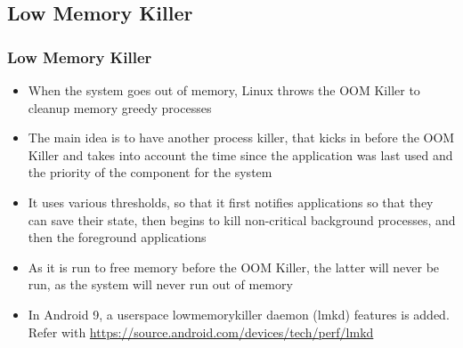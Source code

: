 \subsection{Low Memory Killer}
\begin{frame}
  \frametitle{Low Memory Killer}
  \begin{itemize}
  \item When the system goes out of memory, Linux throws the OOM
    Killer to cleanup memory greedy processes
  \item The main idea is to have another process killer, that kicks in
    before the OOM Killer and takes into account the time since the
    application was last used and the priority of the component
    for the system
  \item It uses various thresholds, so that it first notifies
    applications so that they can save their state, then begins to kill
    non-critical background processes, and then the foreground
    applications
  \item As it is run to free memory before the OOM Killer, the latter
    will never be run, as the system will never run out of memory
  \item In Android 9, a userspace lowmemorykiller daemon (lmkd) features is added.
  Refer with \url{https://source.android.com/devices/tech/perf/lmkd}
  \end{itemize}
\end{frame}
